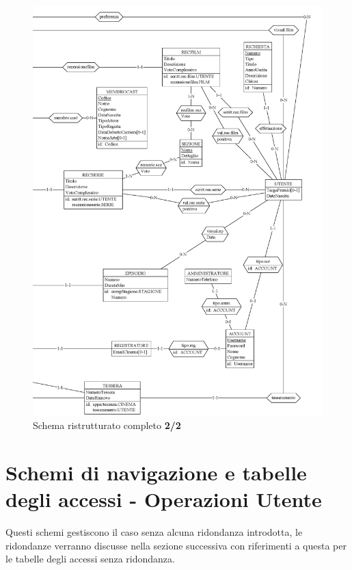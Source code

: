 \documentclass[a4paper,12pt]{report}
\begin{document}
\begin{figure}[H]
	\centering
	\includegraphics[width=450pt]{ER/ristrutturazione/ristcomp2.png}
	\caption{Schema ristrutturato completo \textbf{2/2}}
\end{figure}

\section{Schemi di navigazione e tabelle degli accessi - Operazioni Utente}
Questi schemi gestiscono il caso senza alcuna ridondanza introdotta, le ridondanze verranno discusse nella sezione successiva con riferimenti a questa per le tabelle degli accessi senza ridondanza.
\end{document}
